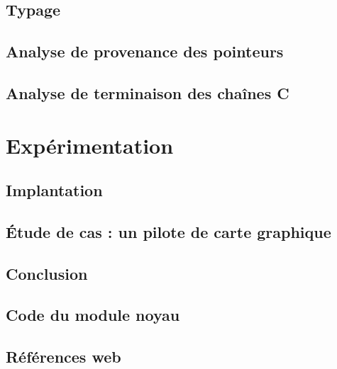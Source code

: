 \documentclass[a4paper,11pt]{memoir}
\begin{document}
\chapter{Typage}

\label{cha:typbase}



%

\chapter{Analyse de provenance des pointeurs}

\label{cha:qualuser}


\chapter{Analyse de terminaison des chaînes C}

\label{cha:qualsz}


\part{Expérimentation}

\chapter{Implantation}

\label{cha:implem}


\chapter{Étude de cas : un pilote de carte graphique}


\chapter{Conclusion}



\appendix

\chapter{Code du module noyau}

\label{cha:code-noyau}


\backmatter


\listoftodos

\clearpage

\listoffigures

\chapter{Références web}

\insertlinks



\end{document}
